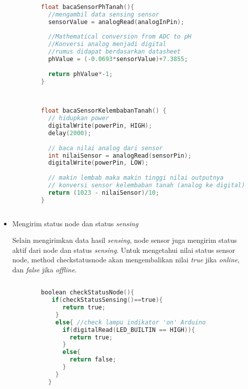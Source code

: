 \begin{itemize}
        \begin{lstlisting}[label= bacaSensorPhTanah, language=C, caption=Metode  bacaSensorPhTanah(), numbers=none]
   
        float bacaSensorPhTanah(){
          //mengambil data sensing sensor
          sensorValue = analogRead(analogInPin);
        
          //Mathematical conversion from ADC to pH
          //Konversi analog menjadi digital
          //rumus didapat berdasarkan datasheet 
          phValue = (-0.0693*sensorValue)+7.3855;
        
          return phValue*-1;
        }
        
        \end{lstlisting}
        
        \begin{lstlisting}[label= bacaSensorKelembabanTanah, language=C, caption=Metode  bacaSensorKelembabanTanah(), numbers=none]
   
        float bacaSensorKelembabanTanah() {
          // hidupkan power
          digitalWrite(powerPin, HIGH);
          delay(2000);
          
          // baca nilai analog dari sensor
          int nilaiSensor = analogRead(sensorPin);
          digitalWrite(powerPin, LOW);
          
          // makin lembab maka makin tinggi nilai outputnya
          // konversi sensor kelembaban tanah (analog ke digital)
          return (1023 - nilaiSensor)/10;
        }
        
        \end{lstlisting}
        
        
        \item Mengirim status node dan status \textit{sensing}
        
        Selain mengirimkan data hasil \textit{sensing}, node sensor juga mengirim status aktif dari node dan status \textit{sensing}. Untuk mengetahui nilai status sensor node, method checkstatusnode akan mengembalikan nilai \textit{true} jika \textit{online}, dan \textit{false} jika \textit{offline}.
        
        \begin{lstlisting}[label=checkStatusNode, language=C, caption=Metode checkStatusNode(), numbers=none]
        
        boolean checkStatusNode(){
           if(checkStatusSensing()==true){
              return true;
            }
            else{ //check lampu indikator 'on' Arduino
              if(digitalRead(LED_BUILTIN == HIGH)){
                return true;  
              }
              else{
                return false;  
              }
            }
          }
        

\end{lstlisting}
\end{itemize}
